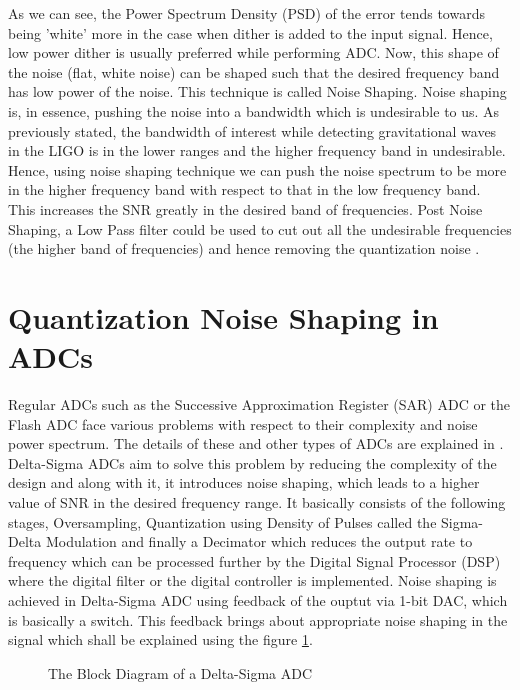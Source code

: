 \documentclass[colorlinks=true,pdfstartview=FitV,linkcolor=blue,
            citecolor=red,urlcolor=magenta]{ligodoc}
\begin{document}
As we can see, the Power Spectrum Density (PSD) of the error tends towards being 'white' more in the case when dither is added to the input signal. 
Hence, low power dither is usually preferred while performing ADC. 
Now, this shape of the noise (flat, white noise) can be shaped such that the desired frequency band has low power of the noise. This technique is called Noise Shaping. 
 Noise shaping is, in essence, pushing the noise into a bandwidth which is undesirable to us. As previously stated, the bandwidth of interest while detecting gravitational waves in the LIGO is in the lower ranges and the higher frequency band in undesirable. Hence, using noise shaping technique we can push the noise spectrum to be more in the higher frequency band with respect to that in the low frequency band. This increases the SNR greatly in the desired band of frequencies.  Post Noise Shaping, a Low Pass filter could be used to cut out all the undesirable frequencies (the higher band of frequencies) and hence removing the quantization noise \cite{Basic_Sigma}.
 
 \section{Quantization Noise Shaping in ADCs}
 Regular ADCs such as the Successive Approximation Register (SAR) ADC or the Flash ADC face various problems with respect to their complexity and noise power spectrum. The details of these and other types of ADCs are explained in \cite{Oppenheim}.\\
 Delta-Sigma ADCs aim to solve this problem by reducing the complexity of the design and along with it, it introduces noise shaping, which leads to a higher value of SNR in the desired frequency range. It basically consists of the following stages, Oversampling, Quantization using Density of Pulses called the Sigma-Delta Modulation and finally a Decimator which reduces the output rate to frequency which can be processed further by the Digital Signal Processor (DSP) where the digital filter or the digital controller is implemented. 
 Noise shaping is achieved in Delta-Sigma ADC using feedback of the ouptut via 1-bit DAC, which is basically a switch. This feedback brings about appropriate noise shaping in the signal which shall be explained using the figure \ref{block2}.
 
 \begin{figure}[htbp]
 
  \centering
  
  \caption{The Block Diagram of a Delta-Sigma ADC}
 \label{block2}
\end{figure}
\end{document}
